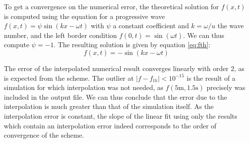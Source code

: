 \documentclass[a4paper,12pt,twoside]{article}
\begin{document}
    To get a convergence on the numerical error, the theoretical solution for $f(x,t)$ is computed using the equation for a progressive wave $f(x,t)=\psi \sin(kx-\omega t)$ with $\psi$ a constant coefficient and $k=\omega/u$ the wave number, and the left border condition $f(0,t)=\sin(\omega t)$. We can thus compute $\psi=-1$. The resulting solution is given by equation \eqref{eq:fth}:
    \begin{equation}
    f(x,t)=-\sin(kx-\omega t)
     \label{eq:fth}
    \end{equation}

    The error of the interpolated numerical result converges linearly with order 2, as is expected from the scheme. The outlier at $|f-f_{th}|<10^{-15}$ is the result of a simulation for which interpolation was not needed, as $f(5 \text{m},1.5\text{s})$ precisely was included in the output file. We can thus conclude that the error due to the interpolation is much greater than that of the simulation itself. As the interpolation error is constant, the slope of the linear fit using only the results which contain an interpolation error indeed corresponds to the order of convergence of the scheme. %
\end{document}
